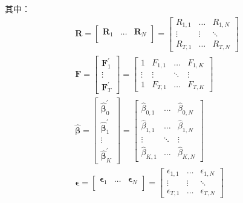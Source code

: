 \documentclass[11pt]{article}
\begin{document}
其中：
\begin{gather*}
    \bm{R} = \begin{bmatrix} \bm{R}_1 & \dots & \bm{R}_N \\ \end{bmatrix}
    = \begin{bmatrix} R_{1,1} & \dots & R_{1,N} \\ \vdots & \vdots & \ddots \\ R_{T,1} & \dots & R_{T,N} \end{bmatrix}
    \\
    \bm{F} = \begin{bmatrix} \bm{F}_{1}^{'} \\ \vdots \\ \bm{F}_{T}^{'} \end{bmatrix}
    = \begin{bmatrix} 1 & F_{1,1} & \dots & F_{1,K} \\ \vdots & \vdots & \ddots & \vdots \\ 1 & F_{T,1} & \dots & F_{T,K} \end{bmatrix} 
    \\
    \hat{\bm{\beta}}
    = \begin{bmatrix} \bm{\hat{\beta}}_{0}^{'} \\ \bm{\hat{\beta}}_{1}^{'} \\ \vdots \\ \bm{\hat{\beta}}_{K}^{'} \end{bmatrix}
    = \begin{bmatrix} \hat{\beta}_{0,1} & \dots & \hat{\beta}_{0,N} \\ \hat{\beta}_{1,1} & \dots & \hat{\beta}_{1,N} \\ \vdots & \ddots & \vdots \\ \hat{\beta}_{K,1} & \dots & \hat{\beta}_{K,N} \end{bmatrix}
    \\
    \bm{\epsilon} = \begin{bmatrix}
        \bm{\epsilon}_1 & \dots & \bm{\epsilon}_N \\
    \end{bmatrix}
    = \begin{bmatrix} \epsilon_{1,1} & \dots & \epsilon_{1,N} \\ \vdots & \vdots & \ddots \\ \epsilon_{T,1} & \dots & \epsilon_{T,N} \end{bmatrix}
\end{gather*}
\end{document}
